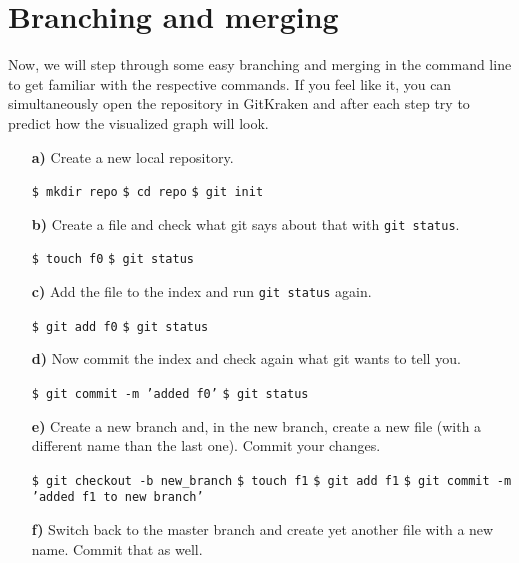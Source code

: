 \documentclass[11pt]{article}
\begin{document}
\section*{Branching and merging}
Now, we will step through some easy branching and merging in the command line to get familiar with the respective commands. If you feel like it, you can simultaneously open the repository in GitKraken and after each step try to predict how the visualized graph will look.
%
\begin{itemize}
\item[\bf{a)}] Create a new local repository.
\begin{framed}
\texttt{\$ mkdir repo} \newline
\texttt{\$ cd repo} \newline
\texttt{\$ git init}
\end{framed}
\item[\bf{b)}] Create a file and check what git says about that with \texttt{git status}.
\begin{framed}
\texttt{\$ touch f0} \newline
\texttt{\$ git status}
\end{framed}
\item[\bf{c)}] Add the file to the index and run \texttt{git status} again.
\begin{framed}
\texttt{\$ git add f0} \newline
\texttt{\$ git status}
\end{framed}
\item[\bf{d)}] Now commit the index and check again what git wants to tell you.
\begin{framed}
\texttt{\$ git commit -m 'added f0'} \newline
\texttt{\$ git status}
\end{framed}
\item[\bf{e)}] Create a new branch and, in the new branch, create a new file (with a different name than the last one). Commit your changes.
\begin{framed}
\texttt{\$ git checkout -b new\_branch} \newline
\texttt{\$ touch f1} \newline
\texttt{\$ git add f1} \newline
\texttt{\$ git commit -m 'added f1 to new branch'}
\end{framed}
\item[\bf{f)}] Switch back to the master branch and create yet another file with a new name. Commit that as well.
\begin{framed}

\end{framed}
\end{itemize}
\end{document}
